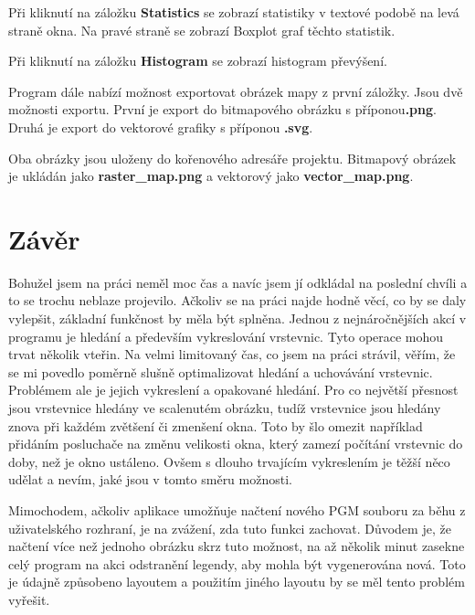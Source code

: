 \documentclass[12pt]{report}
\begin{document}
Při kliknutí na záložku \textbf{Statistics} se zobrazí statistiky v textové podobě na levá straně okna.
Na pravé straně se zobrazí Boxplot graf těchto statistik.

Při kliknutí na záložku \textbf{Histogram} se zobrazí histogram převýšení.

Program dále nabízí možnost exportovat obrázek mapy z první záložky. Jsou dvě možnosti exportu. První
je export do bitmapového obrázku s příponou\nopagebreak  \textbf{.png}.
Druhá je export do vektorové grafiky s příponou \textbf{.svg}.

Oba obrázky jsou uloženy do kořenového adresáře projektu. Bitmapový obrázek je ukládán jako
\textbf{raster\_map.png} a vektorový jako \textbf{vector\_map.png}.
%
\section{Závěr}
Bohužel jsem na práci neměl moc čas a navíc jsem jí odkládal na poslední chvíli a to se trochu neblaze
projevilo. Ačkoliv se na práci najde hodně věcí, co by se daly vylepšit, základní funkčnost by měla být
splněna. Jednou z nejnáročnějších akcí v programu je hledání a především vykreslování vrstevnic. Tyto 
operace mohou trvat několik vteřin. Na velmi limitovaný čas, co jsem na práci strávil, věřím, že se mi 
povedlo poměrně slušně optimalizovat hledání a uchovávání vrstevnic. Problémem ale je jejich vykreslení
a opakované hledání. Pro co největší přesnost jsou vrstevnice hledány ve scalenutém obrázku, tudíž
vrstevnice jsou hledány znova při každém zvětšení či zmenšení okna. Toto by šlo omezit například přidáním
posluchače na změnu velikosti okna, který zamezí počítání vrstevnic do doby, než je okno ustáleno.
Ovšem s dlouho trvajícím vykreslením je těžší něco udělat a nevím, jaké jsou v tomto směru možnosti.

Mimochodem, ačkoliv aplikace umožňuje načtení nového PGM souboru za běhu z uživatelského rozhraní, 
je na zvážení, zda tuto funkci zachovat. Důvodem je, že načtení více než jednoho obrázku skrz tuto možnost,
na až několik minut zasekne celý program na akci odstranění legendy, aby mohla být vygenerována nová.
Toto je údajně způsobeno layoutem a použitím jiného layoutu by se měl tento problém vyřešit.
%
\end{document}
